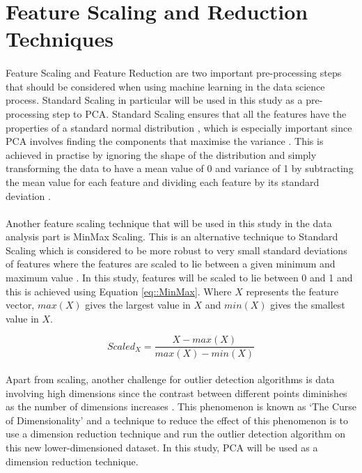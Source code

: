 

\section{Feature Scaling and Reduction Techniques}

\paragraph{ }Feature Scaling and Feature Reduction are two important pre-processing steps that should be considered when using machine learning in the data science process. Standard Scaling in particular will be used in this study as a pre-processing step to \ac{PCA}. Standard Scaling ensures that all the features have the properties of a standard normal distribution \cite{Scikitlearn}, which is especially important since \acs{PCA} involves finding the components that maximise the variance \cite{Shlens2014}. This is achieved in practise by ignoring the shape of the distribution and simply transforming the data to have a mean value of 0 and variance of 1 by subtracting the mean value for each feature and dividing each feature by its standard deviation \cite{Scikitlearn}. 

\paragraph{ }Another feature scaling technique that will be used in this study in the data analysis part is MinMax Scaling. This is an alternative technique to Standard Scaling which is considered to be more robust to very small standard deviations of features where the features are scaled to lie between a given minimum and maximum value \cite{Scikitlearn}. In this study, features will be scaled to lie between 0 and 1 and this is achieved using Equation \ref{eq::MinMax}. Where $X$ represents the feature vector, $max(X)$ gives the largest value in $X$ and $min(X)$ gives the smallest value in $X$.

\begin{equation} \label{eq::MinMax}
Scaled_X = \frac{X-max(X)}{max(X)-min(X)}
\end{equation}

\paragraph{ }Apart from scaling, another challenge for outlier detection algorithms is data involving high dimensions since the contrast between different points diminishes as the number of dimensions increases \cite{Zimek2012}. This phenomenon is known as `The Curse of Dimensionality' and a technique to reduce the effect of this phenomenon is to use a dimension reduction technique and run the outlier detection algorithm on this new lower-dimensioned dataset. In this study, \acs{PCA} will be used as a dimension reduction technique.

